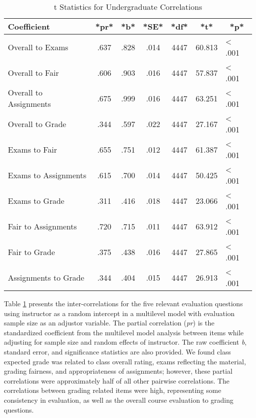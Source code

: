 \documentclass[man]{apa6}
\theoremstyle{definition}
\theoremstyle{definition}
\theoremstyle{definition}
\theoremstyle{remark}
\begin{document}
\begin{table}[tbp]
\begin{center}
\begin{threeparttable}
\caption{\label{tab:correlation-table}t Statistics for Undergraduate Correlations}
\begin{tabular}{lcccccl}
\toprule
Coefficient & \multicolumn{1}{c}{*pr*} & \multicolumn{1}{c}{*b*} & \multicolumn{1}{c}{*SE*} & \multicolumn{1}{c}{*df*} & \multicolumn{1}{c}{*t*} & \multicolumn{1}{c}{*p*}\\
\midrule
Overall to Exams & .637 & .828 & .014 & 4447 & 60.813 & < .001\\
Overall to Fair & .606 & .903 & .016 & 4447 & 57.837 & < .001\\
Overall to Assignments & .675 & .999 & .016 & 4447 & 63.251 & < .001\\
Overall to Grade & .344 & .597 & .022 & 4447 & 27.167 & < .001\\
Exams to Fair & .655 & .751 & .012 & 4447 & 61.387 & < .001\\
Exams to Assignments & .615 & .700 & .014 & 4447 & 50.425 & < .001\\
Exams to Grade & .311 & .416 & .018 & 4447 & 23.066 & < .001\\
Fair to Assignments & .720 & .715 & .011 & 4447 & 63.912 & < .001\\
Fair to Grade & .375 & .438 & .016 & 4447 & 27.865 & < .001\\
Assignments to Grade & .344 & .404 & .015 & 4447 & 26.913 & < .001\\
\bottomrule
\end{tabular}
\end{threeparttable}
\end{center}
\end{table}

Table \ref{tab:correlation-table} presents the inter-correlations for
the five relevant evaluation questions using instructor as a random
intercept in a multilevel model with evaluation sample size as an
adjustor variable. The partial correlation (\emph{pr}) is the
standardized coefficient from the multilevel model analysis between
items while adjusting for sample size and random effects of instructor.
The raw coefficient \emph{b}, standard error, and significance
statistics are also provided. We found class expected grade was related
to class overall rating, exams reflecting the material, grading
fairness, and appropriateness of assignments; however, these partial
correlations were approximately half of all other pairwise correlations.
The correlations between grading related items were high, representing
some consistency in evaluation, as well as the overall course evaluation
to grading questions.
\end{document}
